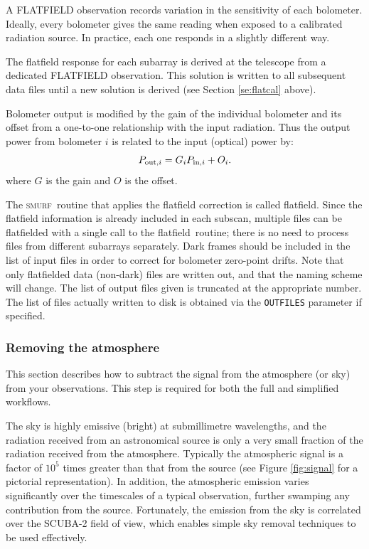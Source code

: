 \documentclass[twoside,11pt]{article}
\newcommand{\xref}[3]{#1}
\newcommand{\xlabel}[1]{}
\renewcommand{\_}{\texttt{\symbol{95}}}
\newcommand{\SMURF}{\textsc{smurf}}
\newcommand{\task}[1]{\textsf{#1}}
\newcommand{\flatfield}{\xref{\task{flatfield}}{sun258}{FLATFIELD}}
\newcommand{\aparam}[1]{\texttt{#1}}     %
\begin{document}
A FLATFIELD observation records variation in the sensitivity of each
bolometer. Ideally, every bolometer gives the same reading when
exposed to a calibrated radiation source. In practice, each one
responds in a slightly different way.

The flatfield response for each subarray is derived at the telescope
from a dedicated FLATFIELD observation. This solution is written to
all subsequent data files until a new solution is derived (see Section
\ref{se:flatcal} above).

Bolometer output is modified by the gain of the individual bolometer
and its offset from a one-to-one relationship with the input
radiation. Thus the output power from bolometer $i$ is related to the
input (optical) power by:
\begin{equation}
P_{{\rm out},i} = G_i P_{{\rm in},i} + O_i.
\end{equation}
where $G$ is the gain and $O$ is the offset.

The \SMURF\ routine that applies the flatfield correction is called
\flatfield. Since the flatfield information is already included in
each subscan, multiple files can be flatfielded with a single call to
the \flatfield\ routine; there is no need to process files from
different subarrays separately. Dark frames should be included in the
list of input files in order to correct for bolometer zero-point
drifts. Note that only flatfielded data (non-dark) files are written
out, and that the naming scheme will change. The list of output files
given is truncated at the appropriate number. The list of files
actually written to disk is obtained via the \aparam{OUTFILES}
parameter if specified.

\subsubsection{\xlabel{skysub}Removing the atmosphere\label{se:skysub}}

This section describes how to subtract the signal from the atmosphere
(or sky) from your observations. This step is required for both the
full and simplified workflows.

The sky is highly emissive (bright) at submillimetre
wavelengths\cite{archibald}, and the radiation received from an
astronomical source is only a very small fraction of the radiation
received from the atmosphere. Typically the atmospheric signal is a
factor of $10^5$ times greater than that from the source (see Figure
\ref{fig:signal} for a pictorial representation). In addition, the
atmospheric emission varies significantly over the timescales of a
typical observation, further swamping any contribution from the
source. Fortunately, the emission from the sky is correlated over the
SCUBA-2 field of view, which enables simple sky removal techniques to
be used effectively\cite{archibald,sc2ana002}.
\end{document}
